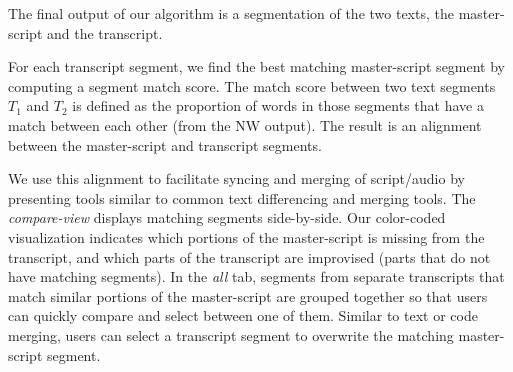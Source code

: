 The final output of our algorithm is a segmentation of the two texts, the master-script and the transcript. 

For each transcript segment, we find the best matching master-script segment by computing a segment match score. The match score between two text segments $T_1$ and $T_2$ is defined as the proportion of words in those segments that have a match between each other (from the NW output).
The result is an alignment between the master-script and transcript segments. 

We use this alignment to facilitate syncing and merging of script/audio by presenting tools similar to  common text differencing and merging tools. The \textit{compare-view} displays matching segments side-by-side. Our color-coded visualization indicates which portions of the master-script is missing from the transcript, and which parts of the transcript are improvised (parts that do not have matching segments). In the \textit{all} tab, segments from separate transcripts that match similar portions of the master-script are grouped together so that users can quickly compare and select between one of them. Similar to text or code merging, users can select a transcript segment to overwrite the matching master-script segment.

